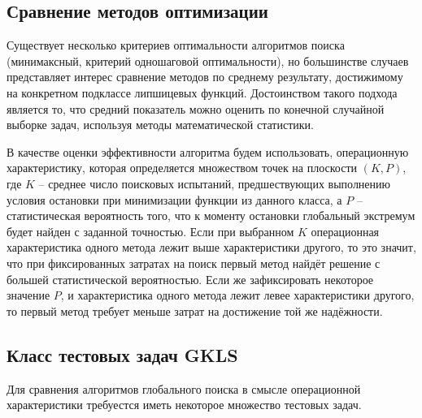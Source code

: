 \subsection{Сравнение методов оптимизации}
Существует несколько критериев оптимальности алгоритмов поиска (минимаксный, критерий одношаговой оптимальности), но большинстве случаев представляет интерес
сравнение методов по среднему результату, достижимому на конкретном подклассе липшицевых функций. Достоинством такого подхода является то, что средний показатель можно оценить
по конечной случайной выборке задач, используя методы математической статистики.
\par
В качестве оценки эффективности алгоритма будем использовать, операционную характеристику, которая определяется множеством точек на плоскости \((K, P)\),
где \(K\) – среднее число поисковых испытаний, предшествующих выполнению условия остановки при минимизации функции из данного класса, а \(P\) – статистическая вероятность того,
что к моменту остановки глобальный экстремум будет найден с заданной точностью. Если при выбранном \(K\) операционная характеристика одного метода лежит выше характеристики другого,
то это значит, что при фиксированных затратах на поиск первый метод найдёт решение с большей статистической вероятностью. Если же зафиксировать некоторое значение \(P\), и
характеристика одного метода лежит левее характеристики другого, то первый метод требует меньше затрат на достижение той же надёжности.
\subsection{Класс тестовых задач GKLS}
Для сравнения алгоритмов глобального поиска в смысле операционной характеристики требуестся иметь некоторое множество тестовых задач.
